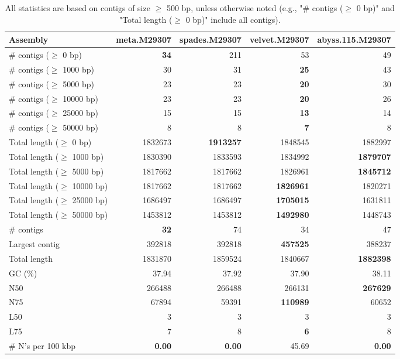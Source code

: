 \documentclass[12pt,a4paper]{article}
\begin{document}
\begin{table}[ht]
\begin{center}
\caption{All statistics are based on contigs of size $\geq$ 500 bp, unless otherwise noted (e.g., "\# contigs ($\geq$ 0 bp)" and "Total length ($\geq$ 0 bp)" include all contigs).}
\begin{tabular}{|l*{4}{|r}|}
\hline
Assembly & meta.M29307 & spades.M29307 & velvet.M29307 & abyss.115.M29307 \\ \hline
\# contigs ($\geq$ 0 bp) & {\bf 34} & 211 & 53 & 49 \\ \hline
\# contigs ($\geq$ 1000 bp) & 30 & 31 & {\bf 25} & 43 \\ \hline
\# contigs ($\geq$ 5000 bp) & 23 & 23 & {\bf 20} & 30 \\ \hline
\# contigs ($\geq$ 10000 bp) & 23 & 23 & {\bf 20} & 26 \\ \hline
\# contigs ($\geq$ 25000 bp) & 15 & 15 & {\bf 13} & 14 \\ \hline
\# contigs ($\geq$ 50000 bp) & 8 & 8 & {\bf 7} & 8 \\ \hline
Total length ($\geq$ 0 bp) & 1832673 & {\bf 1913257} & 1848545 & 1882997 \\ \hline
Total length ($\geq$ 1000 bp) & 1830390 & 1833593 & 1834992 & {\bf 1879707} \\ \hline
Total length ($\geq$ 5000 bp) & 1817662 & 1817662 & 1826961 & {\bf 1845712} \\ \hline
Total length ($\geq$ 10000 bp) & 1817662 & 1817662 & {\bf 1826961} & 1820271 \\ \hline
Total length ($\geq$ 25000 bp) & 1686497 & 1686497 & {\bf 1705015} & 1631811 \\ \hline
Total length ($\geq$ 50000 bp) & 1453812 & 1453812 & {\bf 1492980} & 1448743 \\ \hline
\# contigs & {\bf 32} & 74 & 34 & 47 \\ \hline
Largest contig & 392818 & 392818 & {\bf 457525} & 388237 \\ \hline
Total length & 1831870 & 1859524 & 1840667 & {\bf 1882398} \\ \hline
GC (\%) & 37.94 & 37.92 & 37.90 & 38.11 \\ \hline
N50 & 266488 & 266488 & 266131 & {\bf 267629} \\ \hline
N75 & 67894 & 59391 & {\bf 110989} & 60652 \\ \hline
L50 & 3 & 3 & 3 & 3 \\ \hline
L75 & 7 & 8 & {\bf 6} & 8 \\ \hline
\# N's per 100 kbp & {\bf 0.00} & {\bf 0.00} & 45.69 & {\bf 0.00} \\ \hline
\end{tabular}
\end{center}
\end{table}
\end{document}
